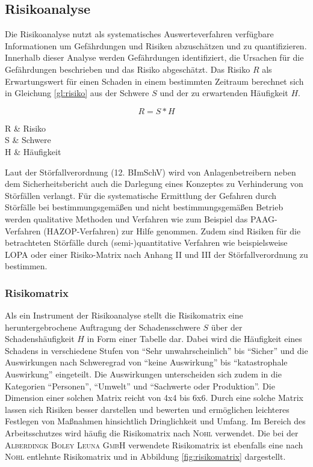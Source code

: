 \subsection{Risikoanalyse}
Die Risikoanalyse nutzt als systematisches Auswerteverfahren verfügbare Informationen um Gefährdungen und Risiken abzuschätzen und zu quantifizieren. Innerhalb dieser Analyse werden Gefährdungen identifiziert, die Ursachen für die Gefährdungen beschrieben und das Risiko abgeschätzt. Das Risiko $R$ als Erwartungswert für einen Schaden in einem bestimmten Zeitraum berechnet sich in Gleichung \eqref{gl:risiko} aus der Schwere $S$ und der zu erwartenden Häufigkeit $H$. \cite{Neumann.2010}

\begin{equation}
	\label{gl:risiko}
	R = S*H
\end{equation}
\begin{parameter}
	R 		& Risiko \\
	S 		& Schwere\\
	H 		& Häufigkeit\\
\end{parameter}

Laut der Störfallverordnung (12. BImSchV) wird von Anlagenbetreibern neben dem Sicherheitsbericht auch die Darlegung eines Konzeptes zu Verhinderung von Störfällen verlangt. Für die systematische Ermittlung der Gefahren durch Störfälle bei bestimmungsgemäßen und nicht bestimmungsgemäßen Betrieb werden qualitative Methoden und Verfahren wie zum Beispiel das PAAG-Verfahren (HAZOP-Verfahren) zur Hilfe genommen. Zudem sind Risiken für die betrachteten Störfälle durch (semi-)quantitative Verfahren wie beispielsweise LOPA oder einer Risiko-Matrix nach Anhang II und III der Störfallverordnung zu bestimmen. \cite{Neumann.2010c}


\subsubsection{Risikomatrix}
Als ein Instrument der Risikoanalyse stellt die Risikomatrix eine heruntergebrochene Auftragung der Schadensschwere $S$ über der Schadenshäufigkeit $H$ in Form einer Tabelle dar. Dabei wird die Häufigkeit eines Schadens in verschiedene Stufen von "`Sehr unwahrscheinlich"' bis "`Sicher"' und die Auswirkungen nach Schweregrad von "`keine Auswirkung"' bis "`katastrophale Auswirkung"' eingeteilt. Die Auswirkungen unterscheiden sich zudem in die Kategorien "`Personen"', "`Umwelt"' und "`Sachwerte oder Produktion"'. Die Dimension einer solchen Matrix reicht von 4x4 bis 6x6. Durch eine solche Matrix lassen sich Risiken besser darstellen und bewerten und ermöglichen leichteres Festlegen von Maßnahmen hinsichtlich Dringlichkeit und Umfang. Im Bereich des Arbeitsschutzes wird häufig die Risikomatrix nach \textsc{Nohl} verwendet. \cite{Neumann.2010b}\linebreak
Die bei der \textsc{Alberdingk Boley Leuna GmbH} verwendete Risikomatrix ist ebenfalls eine nach \textsc{Nohl} entlehnte Risikomatrix und in Abbildung \ref{fig:risikomatrix} dargestellt. 

